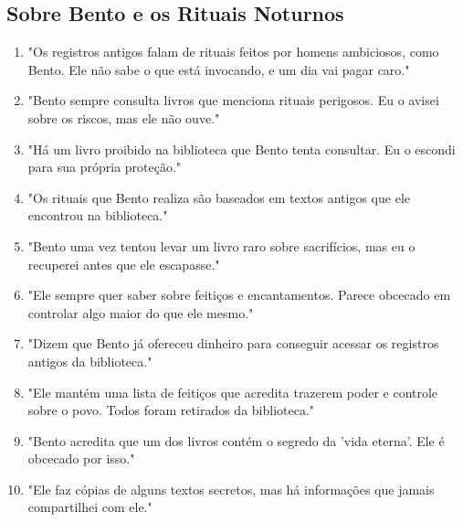 \subsection*{Sobre Bento e os Rituais Noturnos}
\begin{enumerate}
    \item "Os registros antigos falam de rituais feitos por homens ambiciosos, como Bento. Ele não sabe o que está invocando, e um dia vai pagar caro."
    \item "Bento sempre consulta livros que menciona rituais perigosos. Eu o avisei sobre os riscos, mas ele não ouve."
    \item "Há um livro proibido na biblioteca que Bento tenta consultar. Eu o escondi para sua própria proteção."
    \item "Os rituais que Bento realiza são baseados em textos antigos que ele encontrou na biblioteca."
    \item "Bento uma vez tentou levar um livro raro sobre sacrifícios, mas eu o recuperei antes que ele escapasse."
    \item "Ele sempre quer saber sobre feitiços e encantamentos. Parece obcecado em controlar algo maior do que ele mesmo."
    \item "Dizem que Bento já ofereceu dinheiro para conseguir acessar os registros antigos da biblioteca."
    \item "Ele mantém uma lista de feitiços que acredita trazerem poder e controle sobre o povo. Todos foram retirados da biblioteca."
    \item "Bento acredita que um dos livros contém o segredo da 'vida eterna'. Ele é obcecado por isso."
    \item "Ele faz cópias de alguns textos secretos, mas há informações que jamais compartilhei com ele."
\end{enumerate}

